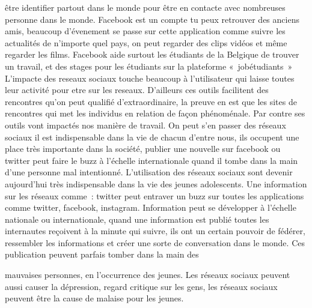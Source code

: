 \documentclass[12pt,a4paper,titlepage]{article}
\begin{document}
être identifier partout dans le monde pour être en contacte
avec nombreuses personne dans le monde. Facebook est un
compte tu peux retrouver des anciens amis, beaucoup
d’évenement se passe sur cette application comme suivre les
actualités de n’importe quel pays, on peut regarder des clips
vidéos et même regarder les films. Facebook aide surtout les
étudiants de la Belgique de trouver un travail, et des stages
pour les étudiants sur la plateforme « jobétudiants »
L’impacte des reseaux sociaux touche beaucoup à l’utilisateur
qui laisse toutes leur activité pour etre sur les reseaux.
D’ailleurs ces outils facilitent des rencontres qu’on peut
qualifié d’extraordinaire, la preuve en est que les sites de
rencontres qui met les individus en relation de façon
phénoménale. Par contre ses outils vont impactés nos
manière de travail. On peut s’en passer des réseaux sociaux il
est indispensable dans la vie de chacun d’entre nous, ils
occupent une place très importante dans la société, publier
une nouvelle sur facebook ou twitter peut faire le buzz à
l’échelle internationale quand il tombe dans la main d’une
personne mal intentionné.
L’utilisation des réseaux sociaux sont devenir aujourd’hui très
indispensable dans la vie des jeunes adolescents. Une
information sur les réseaux comme : twitter peut entraver un
buzz sur toutes les applications comme twitter, facebook,
instagram. Information peut se développer à l’échelle
nationale ou internationale, quand une information est publié
toutes les internautes reçoivent à la minute qui suivre, ils ont
un certain pouvoir de fédérer, ressembler les informations et
créer une sorte de conversation dans le monde. Ces
publication peuvent parfais tomber dans la main des

mauvaises personnes, en l’occurrence des jeunes. Les réseaux
sociaux peuvent aussi causer la dépression, regard critique
sur les gens, les réseaux sociaux peuvent être la cause de
malaise pour les jeunes.
\end{document}
